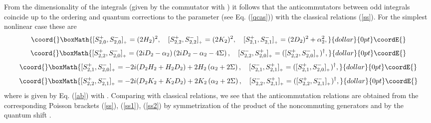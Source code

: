 \documentclass[a4paper,12pt]{article}
\begin{document}
{}From the dimensionality of the integrals
(given by the commutator with \coordHE{})
it follows that the anticommutators between odd integrals
coincide up to the ordering and quantum corrections
to the parameter \myHighlight{$\alpha$}\coordHE{} (see Eq. (\ref{qcas}))
with the classical relations (\ref{ss}).
For the simplest nonlinear case \coordHE{} these are
$$\coord{}\boxMath{
[S^+_{2,0},S^-_{2,0}]_{{}_+}=(2H_2)^2,\quad
[S^+_{2,2},S^-_{2,2}]_{{}_+}=(2K_2)^2,\quad
[S^+_{2,1},S^-_{2,1}]_{{}_+}=(2D_2)^2+\alpha_2^2,
}{dollar}{0pt}\coordE{}$$  $$\coord{}\boxMath{
[S^+_{2,2},S^-_{2,0}]_{{}_+}=\left(2iD_2-\alpha_2
\right)
\left(2iD_2-\alpha_2-4\Sigma\right),\quad
[S^-_{2,2},S^+_{2,0}]_{{}_+}=([S^+_{2,2},S^-_{2,0}]_{{}_+})^
\dagger,
}{dollar}{0pt}\coordE{}$$  $$\coord{}\boxMath{
[S^+_{2,1},S^-_{2,0}]_{{}_+}=
-2i(D_2H_2+H_2D_2)+2H_2\left(\alpha_2+2\Sigma\right),
\quad
[S^-_{2,1},S^+_{2,1}]_{{}_+}=([S^+_{2,1},S^-_{2,0}]_{{}_+})^
\dagger,
}{dollar}{0pt}\coordE{}$$  $$\coord{}\boxMath{
[S^+_{2,2},S^-_{2,1}]_{{}_+}=
-2i(D_2K_2+K_2D_2)+2K_2\left(\alpha_2+2\Sigma\right),\quad
[S^-_{2,2},S^+_{2,1}]_{{}_+}=([S^+_{2,2},S^-_{2,1}]_{{}_+})^
\dagger,
}{dollar}{0pt}\coordE{}$$
where \coordHE{} is given by Eq. (\ref{ab})
with \coordHE{}.
Comparing with classical relations, we see that
the anticommutation relations are obtained from the
corresponding
Poisson brackets (\ref{ss}), (\ref{ss1}), (\ref{ss2}) by
symmetrization of the product of the
noncommuting \coordHE{} generators
and by the quantum shift
\coordHE{}.
\end{document}
